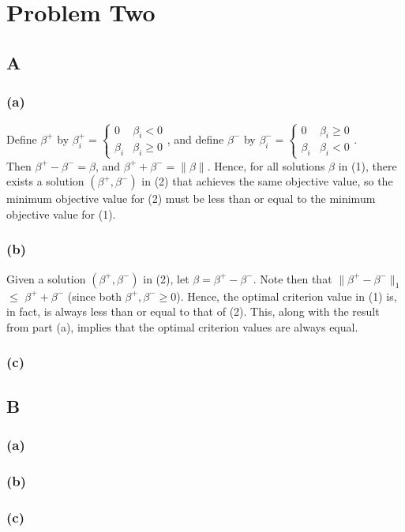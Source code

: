 

\section{Problem Two}


\subsection{A}

\subsubsection{(a)}
Define $\beta^+$ by $\beta_i^+ = \begin{cases} 0 & \beta_i < 0 \\ \beta_i &
\beta_i \geq 0 \end{cases}$, and define $\beta^-$ by $\beta_i^- = \begin{cases} 0 &
\beta_i \geq 0 \\ \beta_i & \beta_i < 0 \end{cases}$.\\
Then $\beta^+ - \beta^- = \beta$, and $\beta^+ + \beta^- = \| \beta \|$. Hence,
for all solutions $\beta$ in (1), there exists a solution $(\beta^+, \beta^-)$
    in (2) that achieves the same objective value, so the minimum objective
    value for (2) must be less than or equal to the minimum objective value for
    (1).

\subsubsection{(b)}
Given a solution $(\beta^+, \beta^-)$ in (2), let $\beta = \beta^+ - \beta^-$. Note then that $\|\beta^+ - \beta^-\|_1$ $\leq$ $\beta^+ + \beta^-$ (since both $\beta^+, \beta^- \geq 0$). Hence, the optimal criterion value in (1) is, in fact, is always less than or equal to that of (2). This, along with the result from part (a), implies that the optimal criterion values are always equal.

\subsubsection{(c)}


\subsection{B}

\subsubsection{(a)}

\subsubsection{(b)}

\subsubsection{(c)}



